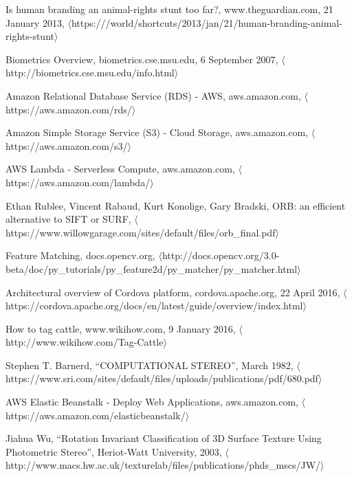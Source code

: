 \begin{thebibliography}{1}

  Is human branding an animal-rights stunt too far?,
  www.theguardian.com,
  21 January 2013,
  $\langle$https:///world/shortcuts/2013/jan/21/human-branding-animal-rights-stunt$\rangle$

  Biometrics Overview,
  biometrics.cse.msu.edu,
  6 September 2007,
  $\langle$http://biometrics.cse.msu.edu/info.html$\rangle$

  Amazon Relational Database Service (RDS) - AWS,
  aws.amazon.com,
  $\langle$https://aws.amazon.com/rds/$\rangle$

  Amazon Simple Storage Service (S3) - Cloud Storage,
  aws.amazon.com,
  $\langle$https://aws.amazon.com/s3/$\rangle$

  AWS Lambda - Serverless Compute,
  aws.amazon.com,
  $\langle$https://aws.amazon.com/lambda/$\rangle$
  
  Ethan Rublee,
  Vincent Rabaud,
  Kurt Konolige,
  Gary Bradski,
  ORB: an efficient alternative to SIFT or SURF,
  $\langle$https://www.willowgarage.com/sites/default/files/orb\_final.pdf$\rangle$

  Feature Matching,
  docs.opencv.org,
  $\langle$http://docs.opencv.org/3.0-beta/doc/py\_tutorials/py\_feature2d/py\_matcher/py\_matcher.html$\rangle$

  Architectural overview of Cordova platform,
  cordova.apache.org,
  22 April 2016,
  $\langle$https://cordova.apache.org/docs/en/latest/guide/overview/index.html$\rangle$
    

  How to tag cattle,
  www.wikihow.com,
  9 January 2016,
  $\langle$http://www.wikihow.com/Tag-Cattle$\rangle$

  Stephen T. Barnerd,
  ``COMPUTATIONAL STEREO'',
  March 1982,
  $\langle$https://www.sri.com/sites/default/files/uploads/publications/pdf/680.pdf$\rangle$

  AWS Elastic Beanstalk - Deploy Web Applications,
  aws.amazon.com,
  $\langle$https://aws.amazon.com/elasticbeanstalk/$\rangle$

  Jiahua Wu,
  ``Rotation Invariant Classification of 3D Surface Texture Using Photometric Stereo'',
  Heriot-Watt University,
  2003,
  $\langle$http://www.macs.hw.ac.uk/texturelab/files/publications/phds\_mscs/JW/$\rangle$

\end{thebibliography}
